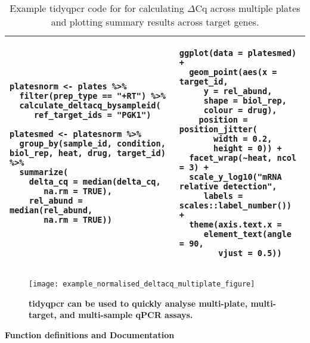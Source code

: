 \documentclass[../main.tex]{subfiles}
\begin{document}
\begin{table}
\centering
\begin{tabular}{| p{5.6cm}  p{5.6cm} |}
\hline
 \begin{lstlisting}[firstnumber=70, style=mystyle]
 platesnorm <- plates %>%
  filter(prep_type == "+RT") %>%
  calculate_deltacq_bysampleid(
     ref_target_ids = "PGK1")

platesmed <- platesnorm %>%
  group_by(sample_id, condition, biol_rep, heat, drug, target_id) %>%
  summarize(
    delta_cq = median(delta_cq,
       na.rm = TRUE),
    rel_abund = median(rel_abund,
       na.rm = TRUE))
 \end{lstlisting}& 
 \begin{lstlisting}[firstnumber=83, style=mystyle]
ggplot(data = platesmed) +
  geom_point(aes(x = target_id,
     y = rel_abund, 
     shape = biol_rep,
     colour = drug),
    position = position_jitter(
       width = 0.2,
       height = 0)) +
  facet_wrap(~heat, ncol = 3) +
  scale_y_log10("mRNA relative detection",
     labels = scales::label_number()) +
  theme(axis.text.x = 
     element_text(angle = 90,
        vjust = 0.5))
\end{lstlisting}   \\
\hline
\end{tabular}
\caption{Example tidyqpcr code for for calculating $\Delta$Cq across multiple plates and plotting summary results across target genes.}
\label{calc-delta-cq}
\end{table}

\begin{figure}[t]

{\centering \texttt{[image: example\_normalised\_deltacq\_multiplate\_figure]}}

\caption[tidyqpcr can be used to quickly analyse multi-plate, multi-target, and multi-sample qPCR assays.]{\textbf{tidyqpcr can be used to quickly analyse multi-plate, multi-target, and multi-sample qPCR assays. }}\label{fig:tidyqpcr-multi-plate}
\end{figure}

\textbf{Function definitions and Documentation}
\end{document}
